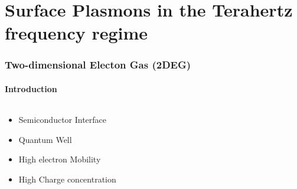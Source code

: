 \documentclass[mathserif,18pt,xcolor=table]{beamer}
\begin{document}
          \section{Surface Plasmons in the Terahertz frequency regime}
          \begin{frame}
            \frametitle{Two-dimensional Electon Gas (2DEG)}
            \framesubtitle{Introduction}
            \begin{columns} %
              \begin{column}{.5\textwidth}
                \begin{minipage}[c][.6\textheight][c]{\linewidth}
                  \begin{itemize}
                    \item Semiconductor Interface
                    \item Quantum Well
                    \item High electron Mobility
                    \item High Charge concentration
                  \end{itemize}
                \end{minipage}
              \end{column}

              \begin{column}{.5\textwidth}

                \begin{figure}
                  \def\svgwidth{\linewidth}
                  
                \end{figure}
                \end{column}%
              \end{columns}
            \end{frame}
              
\end{document}
